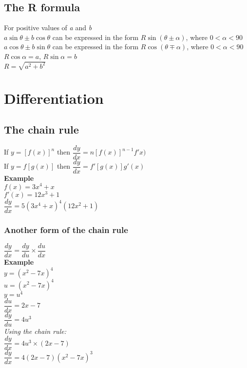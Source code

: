\documentclass{article}[18pt]
\begin{document}
\subsection{The R formula}
For positive values of \textit{a} and \textit{b}
\\
$a\sin\theta\pm b\cos\theta$ can be expressed in the form $R\sin(\theta\pm\alpha)$, where $0<\alpha<90$
\\
$a\cos\theta\pm b\sin\theta$ can be expressed in the form $R\cos(\theta\mp\alpha)$, where $0<\alpha<90$ 
\\
$R\cos\alpha=a$, $R\sin\alpha=b$
\\
$R=\sqrt{a^2+b^2}$
\\
\section{Differentiation}
\subsection{The chain rule}
If $y=[f(x)]^n$ then $\dfrac{dy}{dx}=n[f(x)]^{n-1}f'x)$
\\
If $y=f[g(x)]$ then $\dfrac{dy}{dx}=f'[g(x)]g'(x)$
\\
\textbf{Example}
\\
$f(x)=3x^4+x$
\\
$f'(x)=12x^3+1$
\\
$\dfrac{dy}{dx}=5(3x^4+x)^4(12x^2+1)$
\\
\subsubsection{Another form of the chain rule}
$\dfrac{dy}{dx}=\dfrac{dy}{du}\times\dfrac{du}{dx}$
\\
\textbf{Example}
\\
$y=(x^2-7x)^4$
\\
$u=(x^2-7x)^4$
\\
$y=u^4$
\\
$\dfrac{du}{dx}=2x-7$\\
$\dfrac{dy}{du}=4u^3$\\
\textit{Using the chain rule:}\\
$\dfrac{dy}{dx}=4u^3\times(2x-7)$\\
$\dfrac{dy}{dx}=4(2x-7)(x^2-7x)^3$\\
\end{document}
